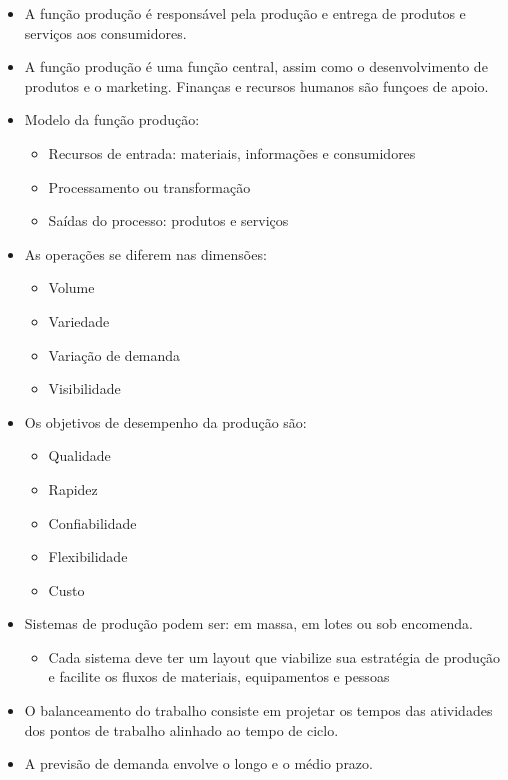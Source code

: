 \documentclass{article}
\begin{document}
\begin{itemize}

    \item A função produção é responsável pela produção e entrega de produtos e serviços aos consumidores.
    \item A função produção é uma função central, assim como o desenvolvimento de produtos e o marketing. Finanças e recursos humanos são funçoes de apoio.
    \item Modelo da função produção:
    \begin{itemize} 
        \item Recursos de entrada: materiais, informações e consumidores
        \item Processamento ou transformação 
        \item Saídas do processo: produtos e serviços
    \end{itemize}
    \item As operações se diferem nas dimensões:
    \begin{itemize}
        \item Volume
        \item Variedade
        \item Variação de demanda
        \item Visibilidade
    \end{itemize}
    \item Os objetivos de desempenho da produção são:
    \begin{itemize}
        \item Qualidade
        \item Rapidez
        \item Confiabilidade
        \item Flexibilidade
        \item Custo
    \end{itemize}
    \item Sistemas de produção podem ser: em massa, em lotes ou sob encomenda. 
    \begin{itemize}
        \item Cada sistema deve ter um layout que viabilize sua estratégia de produção e facilite os fluxos de materiais, equipamentos e pessoas
    \end{itemize}
    \item O balanceamento do trabalho consiste em projetar os tempos das atividades dos pontos de trabalho alinhado ao tempo de ciclo.
    \item A previsão de demanda envolve o longo e o médio prazo.

\end{itemize}
\end{document}
